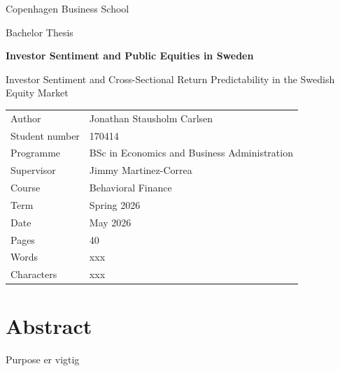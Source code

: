 \documentclass[11pt]{article}
\newcommand{\thesistitle}{Investor Sentiment and Public Equities in Sweden}
\newcommand{\thesistype}{Bachelor Thesis}
\newcommand{\thesisprogramme}{BSc in Economics and Business Administration}
\newcommand{\thesiscourse}{Behavioral Finance}
\newcommand{\thesisterm}{Spring 2026}
\newcommand{\wordcount}{xxx}
\newcommand{\charactercount}{xxx}
\newcommand{\supervisor}{Jimmy Martinez-Correa}
\newcommand{\thesisauthor}{Jonathan Stausholm Carlsen}
\newcommand{\thesisstudentnumber}{170414}
\newcommand{\thesisuniversity}{Copenhagen Business School}
\newcommand{\thesisdate}{May 2026}
\begin{document}
\hypersetup{pageanchor=false}
\begin{titlepage}
    \centering
    \vspace*{1.5cm}

    {\Large \thesisuniversity\par}
    \vspace{0.25cm}
    {\large \thesistype\par}

    \vspace{2.0cm}

    {\huge\bfseries \thesistitle\par}
    \vspace{0.4cm}
    {\large Investor Sentiment and Cross-Sectional Return Predictability in the Swedish Equity Market\par}

    \vspace{2.0cm}

    \begin{tabular}{@{}ll@{}}
        \toprule
        Author & \thesisauthor \\
        Student number & \thesisstudentnumber \\
        Programme & \thesisprogramme \\
        Supervisor & \supervisor \\
        Course & \thesiscourse \\
        Term & \thesisterm \\
        Date & \thesisdate \\
        \midrule
        Pages & 40 \\
        Words & \wordcount\\
        Characters & \charactercount \\
    \end{tabular}

    \vfill
\end{titlepage}

\hypersetup{pageanchor=true}

\tableofcontents
\clearpage


\section*{Abstract}
Purpose er vigtig
\end{document}
